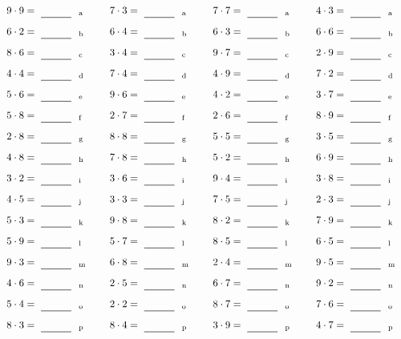 \documentclass
[
  draft    = true,
  fontsize = 11pt,
  parskip  = half-
]
{scrartcl}
\begin{document}
\par\vfill\par
\begin{align*}
    \pline{9\cdot9}&=\rline{a}
  & \pline{7\cdot3}&=\rline{a}
  & \pline{7\cdot7}&=\rline{a}
  & \pline{4\cdot3}&=\rline{a} \\[1ex]
    \pline{6\cdot2}&=\rline{b}
  & \pline{6\cdot4}&=\rline{b}
  & \pline{6\cdot3}&=\rline{b}
  & \pline{6\cdot6}&=\rline{b} \\[1ex]
    \pline{8\cdot6}&=\rline{c}
  & \pline{3\cdot4}&=\rline{c}
  & \pline{9\cdot7}&=\rline{c}
  & \pline{2\cdot9}&=\rline{c} \\[1ex]
    \pline{4\cdot4}&=\rline{d}
  & \pline{7\cdot4}&=\rline{d}
  & \pline{4\cdot9}&=\rline{d}
  & \pline{7\cdot2}&=\rline{d} \\[1ex]
    \pline{5\cdot6}&=\rline{e}
  & \pline{9\cdot6}&=\rline{e}
  & \pline{4\cdot2}&=\rline{e}
  & \pline{3\cdot7}&=\rline{e} \\[1ex]
    \pline{5\cdot8}&=\rline{f}
  & \pline{2\cdot7}&=\rline{f}
  & \pline{2\cdot6}&=\rline{f}
  & \pline{8\cdot9}&=\rline{f} \\[1ex]
    \pline{2\cdot8}&=\rline{g}
  & \pline{8\cdot8}&=\rline{g}
  & \pline{5\cdot5}&=\rline{g}
  & \pline{3\cdot5}&=\rline{g} \\[1ex]
    \pline{4\cdot8}&=\rline{h}
  & \pline{7\cdot8}&=\rline{h}
  & \pline{5\cdot2}&=\rline{h}
  & \pline{6\cdot9}&=\rline{h} \\[1ex]
    \pline{3\cdot2}&=\rline{i}
  & \pline{3\cdot6}&=\rline{i}
  & \pline{9\cdot4}&=\rline{i}
  & \pline{3\cdot8}&=\rline{i} \\[1ex]
    \pline{4\cdot5}&=\rline{j}
  & \pline{3\cdot3}&=\rline{j}
  & \pline{7\cdot5}&=\rline{j}
  & \pline{2\cdot3}&=\rline{j} \\[1ex]
    \pline{5\cdot3}&=\rline{k}
  & \pline{9\cdot8}&=\rline{k}
  & \pline{8\cdot2}&=\rline{k}
  & \pline{7\cdot9}&=\rline{k} \\[1ex]
    \pline{5\cdot9}&=\rline{l}
  & \pline{5\cdot7}&=\rline{l}
  & \pline{8\cdot5}&=\rline{l}
  & \pline{6\cdot5}&=\rline{l} \\[1ex]
    \pline{9\cdot3}&=\rline{m}
  & \pline{6\cdot8}&=\rline{m}
  & \pline{2\cdot4}&=\rline{m}
  & \pline{9\cdot5}&=\rline{m} \\[1ex]
    \pline{4\cdot6}&=\rline{n}
  & \pline{2\cdot5}&=\rline{n}
  & \pline{6\cdot7}&=\rline{n}
  & \pline{9\cdot2}&=\rline{n} \\[1ex]
    \pline{5\cdot4}&=\rline{o}
  & \pline{2\cdot2}&=\rline{o}
  & \pline{8\cdot7}&=\rline{o}
  & \pline{7\cdot6}&=\rline{o} \\[1ex]
    \pline{8\cdot3}&=\rline{p}
  & \pline{8\cdot4}&=\rline{p}
  & \pline{3\cdot9}&=\rline{p}
  & \pline{4\cdot7}&=\rline{p}
\end{align*}
\end{document}
